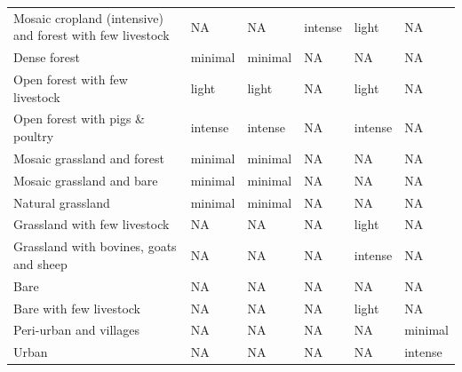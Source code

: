 \documentclass[titlesmallcaps,copyrightpage]{uomthesis}\usepackage[]{graphicx}\usepackage[]{color}
\begin{document}
\begin{table}[htb]
\begin{tabularx}{1\textwidth}{Ylllll}
Mosaic cropland (intensive) and forest with few livestock & NA & NA & intense & light & NA \\
Dense forest & minimal & minimal & NA & NA & NA \\
Open forest with few livestock & light & light & NA & light & NA \\
Open forest with pigs \& poultry & intense & intense & NA & intense & NA \\
Mosaic grassland and forest & minimal & minimal & NA & NA & NA \\
Mosaic grassland and bare & minimal & minimal & NA & NA & NA \\
Natural grassland & minimal & minimal & NA & NA & NA \\
Grassland with few livestock & NA & NA & NA & light & NA \\
Grassland with bovines, goats and sheep & NA & NA & NA & intense & NA \\
Bare & NA & NA & NA & NA & NA \\
Bare with few livestock & NA & NA & NA & light & NA \\
Peri-urban and villages & NA & NA & NA & NA & minimal \\
Urban & NA & NA & NA & NA & intense \\
\bottomrule
\end{tabularx}
\end{table}
\end{document}
